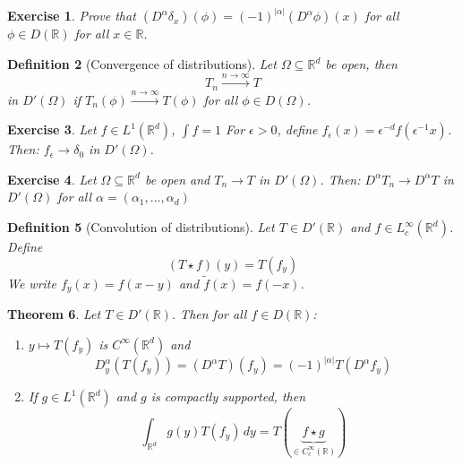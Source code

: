 \documentclass{report}
\theoremstyle{tommy}
\newtheorem{defn}{Definition}
\newtheorem{thm}[defn]{Theorem}
\newtheorem{ex}[defn]{Exercise}
\begin{document}
  \begin{ex}
    Prove that \((D^\alpha \delta_x)(\phi) = (-1)^{|\alpha|}(D^\alpha \phi)(x)\) for all \(\phi \in D(\mathbb{R})\) for all \(x \in \mathbb{R}\).
  \end{ex}

  \begin{defn}[Convergence of distributions]
    Let \(\Omega \subseteq \mathbb{R}^d\) be open, then
    \[T_n \xrightarrow{n \to \infty} T\] in \(D'(\Omega)\) if \(T_n(\phi) \xrightarrow{n \to \infty} T(\phi)\) for all \(\phi \in D(\Omega)\).
  \end{defn}

  \begin{ex}
    Let \(f \in L^1(\mathbb{R}^d)\), \(\int f = 1\) For \(\epsilon > 0\), define \(f_\epsilon(x) = \epsilon^{-d}f(\epsilon^{-1} x)\). Then: \(f_\epsilon \to \delta_0\) in \(D'(\Omega)\).
  \end{ex}
  
  \begin{ex}
    Let \(\Omega \subseteq \mathbb{R}^d\) be open and \(T_n \to T\) in \(D'(\Omega)\). Then:
    \(D^\alpha T_n \to D^\alpha T\) in \(D'(\Omega)\) for all \(\alpha = (\alpha_1, \dots, \alpha_d)\)
  \end{ex}
  
  \begin{defn}[Convolution of distributions]
    Let \(T \in D'(\mathbb{R})\) and \(f \in L_c^\infty(\mathbb{R}^d)\). Define \[(T \star f)(y) = T(f_y)\]
    We write \(f_y(x) = f(x-y)\) and \(\tilde f(x) = f(-x)\).
  \end{defn}
  
  \begin{thm}
    Let \(T \in D'(\mathbb{R})\). Then for all \(f \in D(\mathbb{R})\):
    \begin{enumerate}
      \item \(y \mapsto T(f_y)\) is \(C^\infty(\mathbb{R}^d)\) and 
      \[D_y^\alpha(T(f_y)) = (D^\alpha T)(f_y) = (-1)^{|\alpha|}T(D^\alpha f_y)\]
      \item If \(g \in L^1(\mathbb{R}^d)\) and \(g\) is compactly supported, then
      \[\int_{\mathbb{R}^d} g(y) T(f_y) \, dy = T(\underbrace{f \star g}_{\in C_c^\infty(\mathbb{R})})\]
    \end{enumerate}
  \end{thm}
\end{document}

